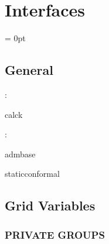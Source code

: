 
\section{Interfaces} 


\parskip = 0pt

\vspace{3mm} \subsection*{General}

: 

calck
\vspace{2mm}

: 

admbase

staticconformal
\vspace{2mm}
\subsection*{Grid Variables}
\vspace{5mm}\subsubsection{PRIVATE GROUPS}

\vspace{5mm}


